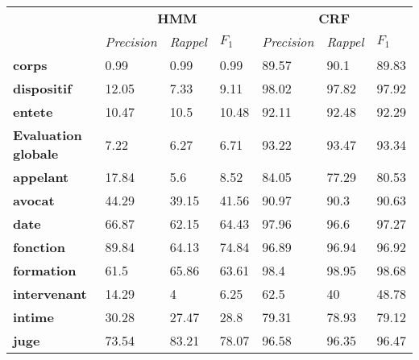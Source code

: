 \begin{table}[!ht]
	\footnotesize
	\centering
	\begin{tabular}{|l|l|l|l|l|l|l|}
		\hline
	\multirow{2}{*}{}	& \multicolumn{3}{c}{\textbf{HMM}}  &      \multicolumn{3}{|c|}{\textbf{CRF}}          \\ \cline{2-7}
		& \textit{Precision} & \textit{Rappel} & $F_1$ & \textit{Precision} & \textit{Rappel} & $F_1$ \\ \hline
		\textbf{corps}         & 0.99               & 0.99            & 0.99        & 89.57              & 90.1            & 89.83       \\ 
		\textbf{dispositif}    & 12.05              & 7.33            & 9.11        & 98.02              & 97.82           & 97.92       \\ 
		\textbf{entete}        & 10.47              & 10.5            & 10.48       & 92.11              & 92.48           & 92.29       \\ \hline
		\textbf{Evaluation globale} & 7.22               & 6.27            & 6.71        & 93.22              & 93.47           & 93.34       \\ \hline
				\noalign{\smallskip}\hline\noalign{\smallskip}
		\textbf{appelant}      & 17.84              & 5.6             & 8.52        & 84.05              & 77.29           & 80.53       \\ 
		\textbf{avocat}        & 44.29              & 39.15           & 41.56       & 90.97              & 90.3            & 90.63       \\ 
		\textbf{date}          & 66.87              & 62.15           & 64.43       & 97.96              & 96.6            & 97.27       \\ 
		\textbf{fonction}      & 89.84              & 64.13           & 74.84       & 96.89              & 96.94           & 96.92       \\ 
		\textbf{formation}     & 61.5               & 65.86           & 63.61       & 98.4               & 98.95           & 98.68       \\ 
		\textbf{intervenant}   & 14.29              & 4               & 6.25        & 62.5               & 40              & 48.78       \\ 
		\textbf{intime}        & 30.28              & 27.47           & 28.8        & 79.31              & 78.93           & 79.12       \\ 
		\textbf{juge}          & 73.54              & 83.21           & 78.07       & 96.58              & 96.35           & 96.47       \\ 

\end{tabular}
\end{table}
